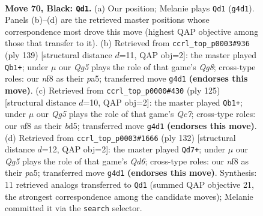 \documentclass[11pt]{article}
\begin{document}
\clearpage

\begin{figure}[p]\centering
\begin{subfigure}{0.46\textwidth}\centering
\resizebox{\linewidth}{!}{%
\newchessgame
\chessboard[
  setfen={5N1K/8/1Q6/8/k5q1/8/8/8 b - - 10 70},
  showmover=false,
  pgfstyle=straightmove, color=movearrow, markmove={g4-d1}
]}
\caption{}
\end{subfigure}\hfill
\begin{subfigure}{0.46\textwidth}\centering
\resizebox{\linewidth}{!}{%
\newchessgame
\chessboard[
  setfen={8/1K6/6k1/P4p2/7Q/8/8/6q1 b - - 8 70},
  showmover=false,
  pgfstyle=straightmove, color=movearrow, markmove={g1-b1}
]}
\caption{}
\end{subfigure}
\\[4pt]
\begin{subfigure}{0.46\textwidth}\centering
\resizebox{\linewidth}{!}{%
\newchessgame
\chessboard[
  setfen={8/8/6k1/3B4/1K6/4Q2P/2q5/8 b - - 4 63},
  showmover=false,
  pgfstyle=straightmove, color=movearrow, markmove={c2-b1}
]}
\caption{}
\end{subfigure}\hfill
\begin{subfigure}{0.46\textwidth}\centering
\resizebox{\linewidth}{!}{%
\newchessgame
\chessboard[
  setfen={8/8/3Q4/p4k2/P7/3K4/8/4q3 w - - 4 67},
  showmover=false,
  pgfstyle=straightmove, color=movearrow, markmove={d6-d7}
]}
\caption{}
\end{subfigure}
\caption{\textbf{Move 70, Black: \texttt{Qd1}.} (a) Our position; Melanie plays \texttt{Qd1} (\texttt{g4d1}). Panels (b)--(d) are the retrieved master positions whose correspondence most drove this move (highest QAP objective among those that transfer to it). (b) Retrieved from \texttt{ccrl\_top\_p0003\#936} (ply 139) [structural distance $d$=11, QAP obj=2]: the master played \texttt{Qb1+}; under $\mu$ our \emph{Qg5} plays the role of that game's \emph{Qg8}; cross-type roles: our \emph{n}f8 as their \emph{p}a5; transferred move \texttt{g4d1} \textbf{(endorses this move)}. (c) Retrieved from \texttt{ccrl\_top\_p0000\#430} (ply 125) [structural distance $d$=10, QAP obj=2]: the master played \texttt{Qb1+}; under $\mu$ our \emph{Qg5} plays the role of that game's \emph{Qc7}; cross-type roles: our \emph{n}f8 as their \emph{b}d5; transferred move \texttt{g4d1} \textbf{(endorses this move)}. (d) Retrieved from \texttt{ccrl\_top\_p0003\#1666} (ply 132) [structural distance $d$=12, QAP obj=2]: the master played \texttt{Qd7+}; under $\mu$ our \emph{Qg5} plays the role of that game's \emph{Qd6}; cross-type roles: our \emph{n}f8 as their \emph{p}a5; transferred move \texttt{g4d1} \textbf{(endorses this move)}. Synthesis: 11 retrieved analogs transferred to \texttt{Qd1} (summed QAP objective 21, the strongest correspondence among the candidate moves); Melanie committed it via the \texttt{search} selector.}
\label{fig:thought-m139}
\end{figure}
\end{document}
